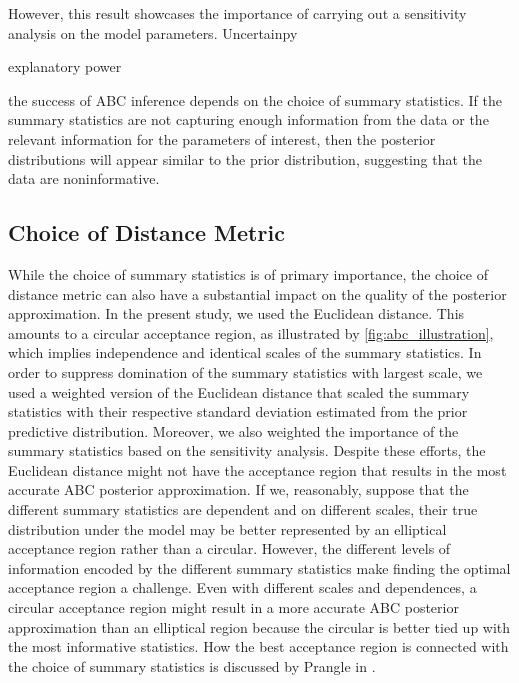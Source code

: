 However, this result showcases the importance of carrying out a sensitivity analysis on the model parameters. Uncertainpy

explanatory power

the success of ABC inference depends on the choice of summary statistics. If the summary statistics are not capturing enough information from the data or the relevant information for the parameters of interest, then the posterior distributions will appear similar to the prior distribution, suggesting that the data are noninformative. 


\subsection{Choice of Distance Metric}

While the choice of summary statistics is of primary importance, the choice of distance metric can also have a substantial impact on the quality of the posterior approximation. In the present study, we used the Euclidean distance. This amounts to a circular acceptance region, as illustrated by \autoref{fig:abc_illustration}, which implies independence and identical scales of the summary statistics. In order to suppress domination of the summary statistics with largest scale, we used a weighted version of the Euclidean distance that scaled the summary statistics with their respective standard deviation estimated from the prior predictive distribution. Moreover, we also weighted the importance of the summary statistics based on the sensitivity analysis. Despite these efforts, the Euclidean distance might not have the acceptance region that results in the most accurate ABC posterior approximation. If we, reasonably, suppose that the different summary statistics are dependent and on different scales, their true distribution under the model may be better represented by an elliptical acceptance region rather than a circular. However, the different levels of information encoded by the different summary statistics make finding the optimal acceptance region a challenge. Even with different scales and dependences, a circular acceptance region might result in a more accurate ABC posterior approximation than an elliptical region because the circular is better tied up with the most informative statistics. How the best acceptance region is connected with the choice of summary statistics is discussed by Prangle in \cite{prangle_distance}. 


